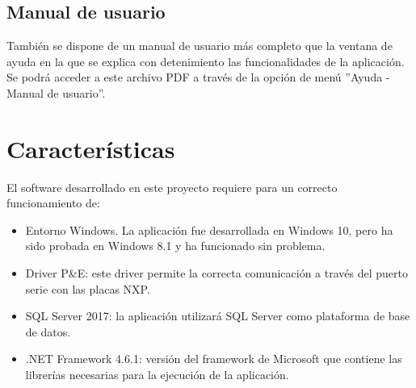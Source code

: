 
\subsection{Manual de usuario}

También se dispone de un manual de usuario más completo que la ventana de ayuda en la que se explica con detenimiento las funcionalidades de la aplicación. Se podrá acceder a este archivo PDF a través de la opción de menú ''Ayuda - Manual de usuario''.


\section{Características}

El software desarrollado en este proyecto requiere para un correcto funcionamiento de:
\begin{itemize}
	\item Entorno Windows. La aplicación fue desarrollada en Windows 10, pero ha sido probada en Windows 8.1 y ha funcionado sin problema.
	\item Driver P\&E: este driver permite la correcta comunicación a través del puerto serie con las placas NXP.
	\item SQL Server 2017: la aplicación utilizará SQL Server como plataforma de base de datos.
	\item .NET Framework 4.6.1: versión del framework de Microsoft que contiene las librerías necesarias para la ejecución de la aplicación.
\end{itemize}
